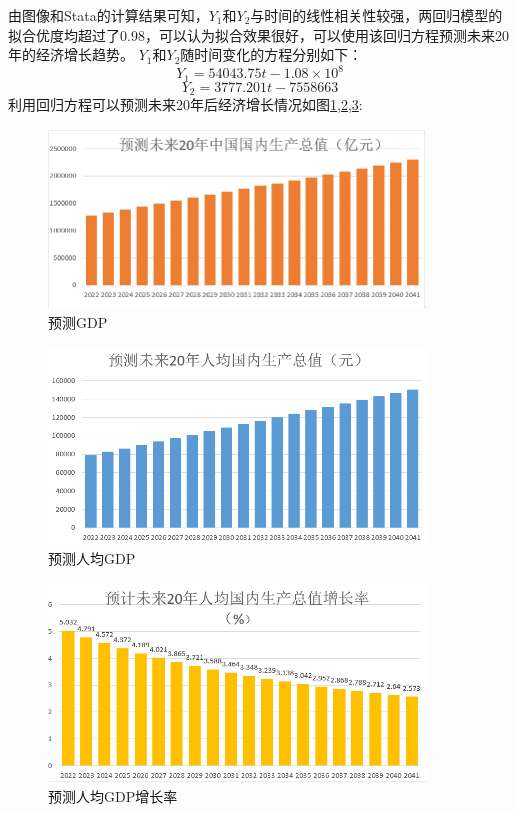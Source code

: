 \documentclass[UTF8]{article}
\begin{document}
	由图像和Stata的计算结果可知，$Y_1$和$Y_2$与时间的线性相关性较强，两回归模型的拟合优度均超过了0.98，可以认为拟合效果很好，可以使用该回归方程预测未来20年的经济增长趋势。 $Y_1$和$Y_2$随时间变化的方程分别如下：
	$$
		Y_1=54043.75t-1.08\times10^8
	$$
	$$
		Y_2=3777.201t-7558663
	$$
	利用回归方程可以预测未来20年后经济增长情况如图\ref{ycjj1},\ref{ycjj2},\ref{ycjj3}:
	\vspace{-2cm}
	\begin{figure}[htb]
	\centering
	\includegraphics[width=10cm]{pictures/ycjj1.png}
	\caption{预测GDP}
	\label{ycjj1}
	\end{figure}
	\begin{figure}[htb]
	\centering
	\includegraphics[width=10cm]{pictures/ycjj2.png}
	\caption{预测人均GDP}
	\label{ycjj2}
	\end{figure}
	\begin{figure}[htb]
	\centering
	\includegraphics[width=10cm]{pictures/ycjj3.png}
	\caption{预测人均GDP增长率}
	\label{ycjj3}
	\end{figure}
\end{document}
